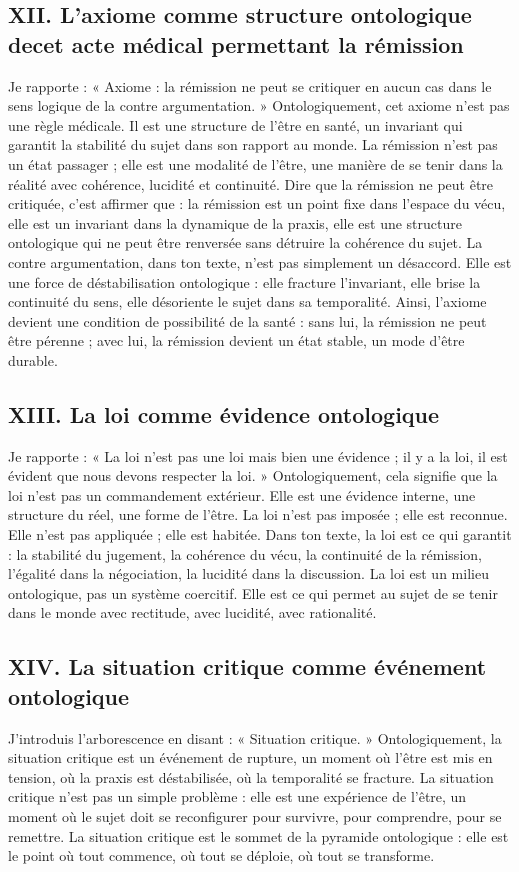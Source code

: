 \documentclass[12pt,a4paper]{article}
\begin{document}
\subsection*{XII. L’axiome comme structure ontologique decet acte médical permettant la rémission}
Je rapporte :
« Axiome : la rémission ne peut se critiquer en aucun cas dans le sens logique de la contre argumentation. »
Ontologiquement, cet axiome n’est pas une règle médicale. Il est une structure de l’être en santé, un invariant qui garantit la stabilité du sujet dans son rapport au monde. La rémission n’est pas un état passager ; elle est une modalité de l’être, une manière de se tenir dans la réalité avec cohérence, lucidité et continuité.
Dire que la rémission ne peut être critiquée, c’est affirmer que :
	la rémission est un point fixe dans l’espace du vécu,
	elle est un invariant dans la dynamique de la praxis,
	elle est une structure ontologique qui ne peut être renversée sans détruire la cohérence du sujet.
La contre argumentation, dans ton texte, n’est pas simplement un désaccord. Elle est une force de déstabilisation ontologique : elle fracture l’invariant, elle brise la continuité du sens, elle désoriente le sujet dans sa temporalité.
Ainsi, l’axiome devient une condition de possibilité de la santé : sans lui, la rémission ne peut être pérenne ; avec lui, la rémission devient un état stable, un mode d’être durable.

\subsection*{XIII. La loi comme évidence ontologique}
Je rapporte :
« La loi n’est pas une loi mais bien une évidence ; il y a la loi, il est évident que nous devons respecter la loi. »
Ontologiquement, cela signifie que la loi n’est pas un commandement extérieur. Elle est une évidence interne, une structure du réel, une forme de l’être. La loi n’est pas imposée ; elle est reconnue. Elle n’est pas appliquée ; elle est habitée.
Dans ton texte, la loi est ce qui garantit :
	la stabilité du jugement,
	la cohérence du vécu,
	la continuité de la rémission,
	l’égalité dans la négociation,
	la lucidité dans la discussion.
La loi est un milieu ontologique, pas un système coercitif. Elle est ce qui permet au sujet de se tenir dans le monde avec rectitude, avec lucidité, avec rationalité.

\subsection*{XIV. La situation critique comme événement ontologique}
J’introduis l’arborescence en disant :
« Situation critique. »
Ontologiquement, la situation critique est un événement de rupture, un moment où l’être est mis en tension, où la praxis est déstabilisée, où la temporalité se fracture. La situation critique n’est pas un simple problème : elle est une expérience de l’être, un moment où le sujet doit se reconfigurer pour survivre, pour comprendre, pour se remettre.
La situation critique est le sommet de la pyramide ontologique : elle est le point où tout commence, où tout se déploie, où tout se transforme.
\end{document}
